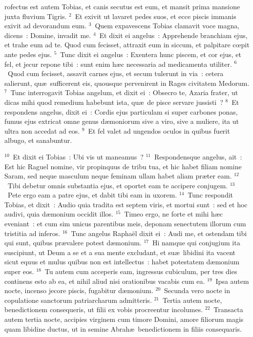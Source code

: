 \bchapter
{}rofectus est autem Tobias, et canis secutus est eum, et mansit prima mansione juxta fluvium Tigris.
${}^{2}$~Et exivit ut lavaret pedes suos, et ecce piscis immanis exivit ad devorandum eum.
${}^{3}$~Quem expavescens Tobias clamavit voce magna, dicens~: Domine, invadit me.
${}^{4}$~Et dixit ei angelus~: Apprehende branchiam ejus, et trahe eum ad te. Quod cum fecisset, attraxit eum in siccum, et palpitare cœpit ante pedes ejus.
${}^{5}$~Tunc dixit ei angelus~: Exentera hunc piscem, et cor ejus, et fel, et jecur repone tibi~: sunt enim h\ae c necessaria ad medicamenta utiliter.
${}^{6}$~Quod cum fecisset, assavit carnes ejus, et secum tulerunt in via~: cetera salierunt, qu\ae\ sufficerent eis, quousque pervenirent in Rages civitatem Medorum.
${}^{7}$~Tunc interrogavit Tobias angelum, et dixit ei~: Obsecro te, Azaria frater, ut dicas mihi quod remedium habebunt ista, qu\ae\ de pisce servare jussisti~?
${}^{8}$~Et respondens angelus, dixit ei~: Cordis ejus particulam si super carbones ponas, fumus ejus extricat omne genus d\ae moniorum sive a viro, sive a muliere, ita ut ultra non accedat ad eos.
${}^{9}$~Et fel valet ad ungendos oculos in quibus fuerit albugo, et sanabuntur.


${}^{10}$~Et dixit ei Tobias~: Ubi vis ut maneamus~?
${}^{11}$~Respondensque angelus, ait~: Est hic Raguel nomine, vir propinquus de tribu tua, et hic habet filiam nomine Saram, sed neque masculum neque feminam ullam habet aliam pr\ae ter eam.
${}^{12}$~Tibi debetur omnis substantia ejus, et oportet eam te accipere conjugem.
${}^{13}$~Pete ergo eam a patre ejus, et dabit tibi eam in uxorem.
${}^{14}$~Tunc respondit Tobias, et dixit~: Audio quia tradita est septem viris, et mortui sunt~: sed et hoc audivi, quia d\ae monium occidit illos.
${}^{15}$~Timeo ergo, ne forte et mihi h\ae c eveniant~: et cum sim unicus parentibus meis, deponam senectutem illorum cum tristitia ad inferos.
${}^{16}$~Tunc angelus Rapha\"el dixit ei~: Audi me, et ostendam tibi qui sunt, quibus pr\ae valere potest d\ae monium.
${}^{17}$~Hi namque qui conjugium ita suscipiunt, ut Deum a se et a sua mente excludant, et su\ae\ libidini ita vacent sicut equus et mulus quibus non est intellectus~: habet potestatem d\ae monium super eos.
${}^{18}$~Tu autem cum acceperis eam, ingressus cubiculum, per tres dies continens esto ab ea, et nihil aliud nisi orationibus vacabis cum ea.
${}^{19}$~Ipsa autem nocte, incenso jecore piscis, fugabitur d\ae monium.
${}^{20}$~Secunda vero nocte in copulatione sanctorum patriarcharum admitteris.
${}^{21}$~Tertia autem nocte, benedictionem consequeris, ut filii ex vobis procreentur incolumes.
${}^{22}$~Transacta autem tertia nocte, accipies virginem cum timore Domini, amore filiorum magis quam libidine ductus, ut in semine Abrah\ae\ benedictionem in filiis consequaris.

